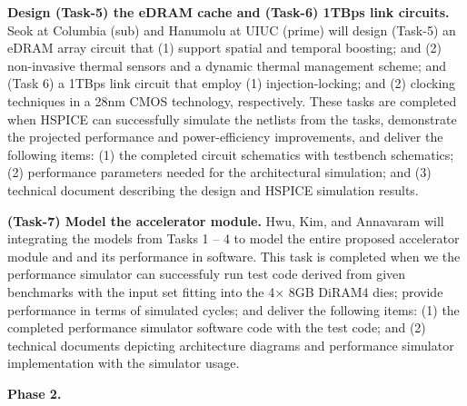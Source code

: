 \noindent
\textbf{Design (Task-5) the eDRAM cache and (Task-6) 1TBps link circuits.}
Seok at Columbia (sub) and Hanumolu at UIUC (prime) will design 
(Task-5) an eDRAM array circuit that (1) support spatial and temporal boosting; and (2) non-invasive thermal sensors and a dynamic thermal management scheme; and 
(Task 6) a 1TBps link circuit that employ (1) injection-locking; and (2) clocking techniques in a 28nm CMOS technology, respectively.
These tasks are completed when HSPICE can successfully simulate the netlists from the tasks, demonstrate the projected performance and power-efficiency improvements, and deliver the following items:
(1) the completed circuit schematics with testbench schematics; (2) performance parameters needed for the architectural simulation; and (3) technical document describing the design and HSPICE simulation results.


\noindent
\textbf{(Task-7) Model the accelerator module.}
Hwu, Kim, and Annavaram will integrating the models from Tasks 1 -- 4 to model the entire proposed accelerator module and and its performance in software. 
This task is completed when we the performance simulator can successfuly run test code derived from given benchmarks with the input set fitting into the 4$\times$ 8GB DiRAM4 dies; provide performance in terms of simulated cycles; and deliver the following items:
(1) the completed performance simulator software code with the test code; and (2) technical documents depicting architecture diagrams and performance simulator implementation with the simulator usage.


\noindent
\textbf{Phase 2.}
%

